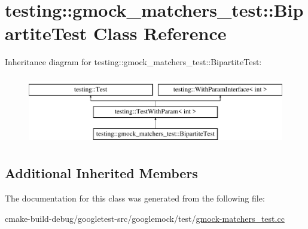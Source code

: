 \hypertarget{classtesting_1_1gmock__matchers__test_1_1BipartiteTest}{}\section{testing\+::gmock\+\_\+matchers\+\_\+test\+::Bipartite\+Test Class Reference}
\label{classtesting_1_1gmock__matchers__test_1_1BipartiteTest}
Inheritance diagram for testing\+::gmock\+\_\+matchers\+\_\+test\+::Bipartite\+Test\+:\begin{figure}[H]
\begin{center}
\leavevmode
\includegraphics[height=3.000000cm]{classtesting_1_1gmock__matchers__test_1_1BipartiteTest}
\end{center}
\end{figure}
\subsection*{Additional Inherited Members}


The documentation for this class was generated from the following file\+:\begin{DoxyCompactItemize}
\item 
cmake-\/build-\/debug/googletest-\/src/googlemock/test/\mbox{\hyperlink{gmock-matchers__test_8cc}{gmock-\/matchers\+\_\+test.\+cc}}\end{DoxyCompactItemize}
